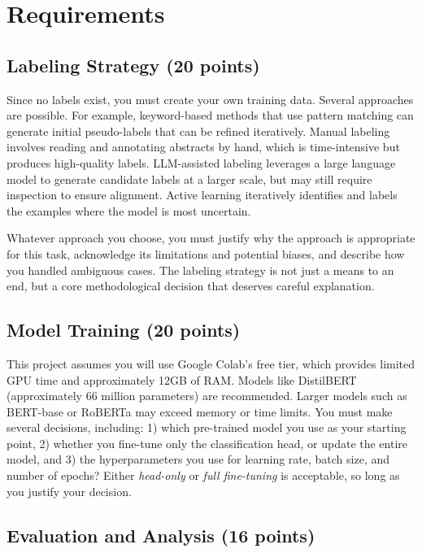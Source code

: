 \documentclass[11pt]{article}
\begin{document}
\section*{Requirements}

\subsection*{Labeling Strategy (20 points)}

Since no labels exist, you must create your own training data. Several approaches are possible. For example, keyword-based methods that use pattern matching can generate initial pseudo-labels that can be refined iteratively. Manual labeling involves reading and annotating abstracts by hand, which is time-intensive but produces high-quality labels. LLM-assisted labeling leverages a large language model to generate candidate labels at a larger scale, but may still require inspection to ensure alignment. Active learning iteratively identifies and labels the examples where the model is most uncertain.

Whatever approach you choose, you must justify why the approach is appropriate for this task, acknowledge its limitations and potential biases, and describe how you handled ambiguous cases. The labeling strategy is not just a means to an end, but a core methodological decision that deserves careful explanation.

\subsection*{Model Training (20 points)}

This project assumes you will use Google Colab's free tier, which provides limited GPU time and approximately 12GB of RAM. Models like DistilBERT (approximately 66 million parameters) are recommended. Larger models such as BERT-base or RoBERTa may exceed memory or time limits. You must make several decisions, including: 1) which pre-trained model you use as your starting point, 2) whether you fine-tune only the classification head, or update the entire model, and 3) the hyperparameters you use for learning rate, batch size, and number of epochs? Either \textit{head-only} or \textit{full fine-tuning} is acceptable, so long as you justify your decision.

\subsection*{Evaluation and Analysis (16 points)}
\end{document}
